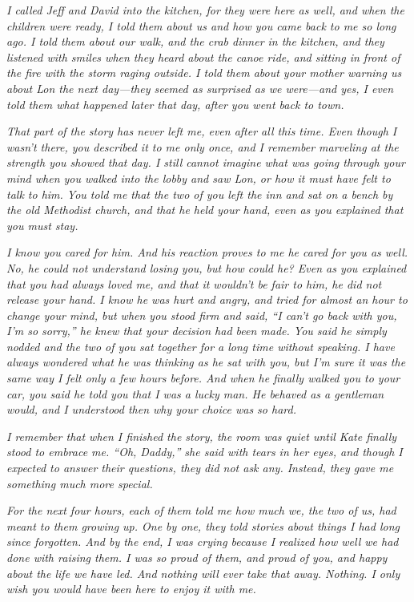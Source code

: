 \documentclass[10pt, twoside, openright]{book}
\begin{document}
\emph{I called Jeff and David into the kitchen, for they were here as
well, and when the children were ready, I told them about us and how you
came back to me so long ago. I told them about our walk, and the crab
dinner in the kitchen, and they listened with smiles when they heard
about the canoe ride, and sitting in front of the fire with the storm
raging outside. I told them about your mother warning us about Lon the
next day---they seemed as surprised as we were---and yes, I even told
them what happened later that day, after you went back to town.}

\emph{That part of the story has never left me, even after all this
time. Even though I wasn't there, you described it to me only once, and
I remember marveling at the strength you showed that day. I still cannot
imagine what was going through your mind when you walked into the lobby
and saw Lon, or how it must have felt to talk to him. You told me that
the two of you left the inn and sat on a bench by the old Methodist
church, and that he held your hand, even as you explained that you must
stay.}

\emph{I know you cared for him. And his reaction proves to me he cared
for you as well. No, he could not understand losing you, but how could
he? Even as you explained that you had always loved me, and that it
wouldn't be fair to him, he did not release your hand. I know he was
hurt and angry, and tried for almost an hour to change your mind, but
when you stood firm and said, ``I can't go back with you, I'm so
sorry,'' he knew that your decision had been made. You said he simply
nodded and the two of you sat together for a long time without speaking.
I have always wondered what he was thinking as he sat with you, but I'm
sure it was the same way I felt only a few hours before. And when he
finally walked you to your car, you said he told you that I was a lucky
man. He behaved as a gentleman would, and I understood then why your
choice was so hard.}

\emph{I remember that when I finished the story, the room was quiet
until Kate finally stood to embrace me. ``Oh, Daddy,'' she said with
tears in her eyes, and though I expected to answer their questions, they
did not ask any. Instead, they gave me something much more special.}

\emph{For the next four hours, each of them told me how much we, the two
of us, had meant to them growing up. One by one, they told stories about
things I had long since forgotten. And by the end, I was crying because
I realized how well we had done with raising them. I was so proud of
them, and proud of you, and happy about the life we have led. And
nothing will ever take that away. Nothing. I only wish you would have
been here to enjoy it with me.}
\end{document}
